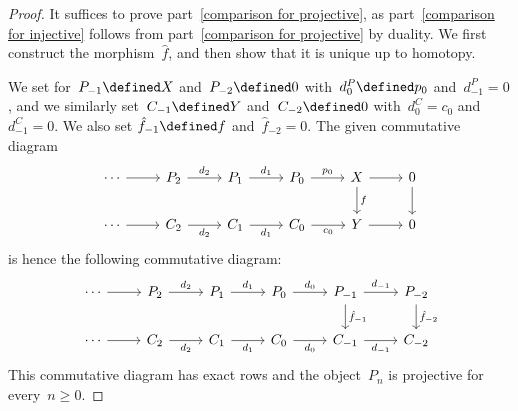 \begin{proof}
  It suffices to prove part~\ref*{comparison for projective}, as part~\ref*{comparison for injective} follows from part~\ref*{comparison for projective} by duality.
  We first construct the morphism~$\hat{f}$, and then show that it is unique up to homotopy.
  
  We set for~$P_{-1} \defined X$ and~$P_{-2} \defined 0$ with~$d^P_0 \defined p_0$ and~$d^P_{-1} = 0$, and we similarly set~$C_{-1} \defined Y$ and~$C_{-2} \defined 0$ with~$d^C_0 = c_0$ and~$d^C_{-1} = 0$.
  We also set $\hat{f}_{-1} \defined f$ and~$\hat{f}_{-2} = 0$.
  The given commutative diagram
  \[
    \begin{tikzcd}
        \dotsb
        \arrow{r}
      & P_2
        \arrow{r}[above]{d_2}
      & P_1
        \arrow{r}[above]{d_1}
      & P_0
        \arrow{r}[above]{p_0}
      & X
        \arrow{r}
        \arrow{d}[right]{f}
      & 0
        \arrow{d}
      \\
        \dotsb
        \arrow{r}
      & C_2
        \arrow{r}[below]{d_2}
      & C_1
        \arrow{r}[below]{d_1}
      & C_0
        \arrow{r}[below]{c_0}
      & Y
        \arrow{r}
      & 0
    \end{tikzcd}
  \]
  is hence the following commutative diagram:
  \[
    \begin{tikzcd}
        \dotsb
        \arrow{r}
      & P_2
        \arrow{r}[above]{d_2}
      & P_1
        \arrow{r}[above]{d_1}
      & P_0
        \arrow{r}[above]{d_0}
      & P_{-1}
        \arrow{r}[above]{d_{-1}}
        \arrow{d}[right]{\hat{f}_{-1}}
      & P_{-2}
        \arrow{d}[right]{\hat{f}_{-2}}
      \\
        \dotsb
        \arrow{r}
      & C_2
        \arrow{r}[below]{d_2}
      & C_1
        \arrow{r}[below]{d_1}
      & C_0
        \arrow{r}[below]{d_0}
      & C_{-1}
        \arrow{r}[below]{d_{-1}}
      & C_{-2}
    \end{tikzcd}
  \]
  This commutative diagram has exact rows and the object~$P_n$ is projective for every~$n \geq 0$.
  

\end{proof}
